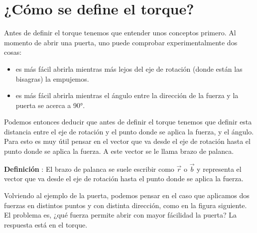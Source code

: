 \documentclass[letterpaper]{article}
\newcounter{definiciones}
\newcommand{\defii}{\stepcounter{definiciones} \textbf{Definición \thedefiniciones}: }
\newenvironment{defi}{\begin{framed} \defii}{\end{framed}}
\begin{document}
\section*{¿Cómo se define el torque?}

Antes de definir el torque tenemos que entender unos conceptos primero. Al momento de abrir una puerta, uno puede comprobar experimentalmente dos cosas: 
\begin{itemize}

\item es más fácil abrirla mientras más lejos del eje de rotación (donde están las bisagras) la empujemos.

\item es más fácil abrirla mientras el ángulo entre la dirección de la fuerza y la puerta se acerca a \ang{90}.

\end{itemize}

Podemos entonces deducir que antes de definir el torque tenemos que definir esta distancia entre el eje de rotación y el punto donde se aplica la fuerza, y el ángulo. Para esto es muy útil pensar en el vector que va desde el eje de rotación hasta el punto donde se aplica la fuerza. A este vector se le llama brazo de palanca.

\begin{defi}
El brazo de palanca se suele escribir como $\vec{r}$ o $\vec{b}$ y representa el vector que va desde el eje de rotación hasta el punto donde se aplica la fuerza.
\end{defi}

Volviendo al ejemplo de la puerta, podemos pensar en el caso que aplicamos dos fuerzas en distintos puntos y con distinta dirección, como en la figura siguiente. El problema es, ¿qué fuerza permite abrir con mayor fácilidad la puerta? La respuesta está en el torque.

\begin{figure}[h]
\centering
{}
\end{figure}
\end{document}
